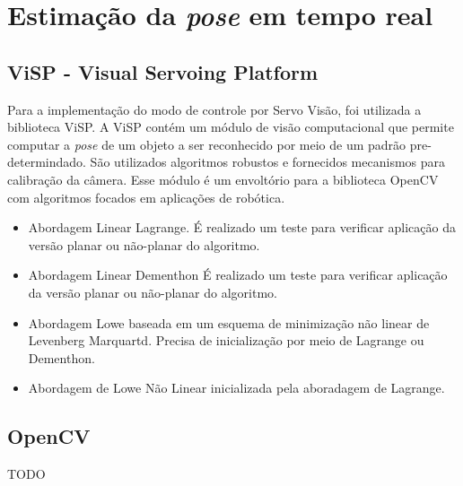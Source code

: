 \chapter{Estimação da \textit{pose} em tempo real}  \label{chap:pose_est}
\section{ViSP - Visual Servoing Platform}

Para a implementação do modo de controle por Servo Visão, foi utilizada a biblioteca ViSP. A ViSP contém um módulo de visão computacional que permite computar a \textit{pose} de um objeto a ser reconhecido por meio de um padrão pre-determindado. São utilizados algoritmos robustos e fornecidos mecanismos para calibração da câmera. Esse módulo é um envoltório para a biblioteca OpenCV com algoritmos focados em aplicações de robótica.

\begin{itemize}
\item Abordagem Linear Lagrange. É realizado um teste para verificar aplicação da versão planar ou não-planar do algoritmo. 
\item Abordagem Linear Dementhon  É realizado um teste para verificar aplicação da versão planar ou não-planar do algoritmo. 
\item Abordagem Lowe baseada em um esquema de minimização não linear de Levenberg Marquartd. Precisa de inicialização por meio de Lagrange ou Dementhon.
\item  Abordagem de Lowe Não Linear inicializada pela aboradagem de Lagrange.
\end{itemize}

\section{OpenCV}
TODO
